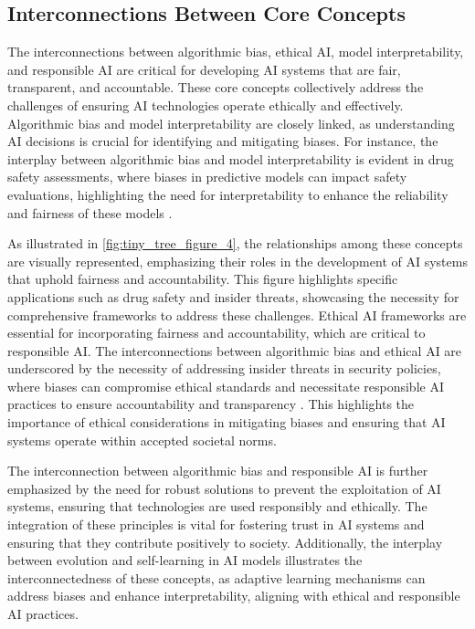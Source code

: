 \subsection{Interconnections Between Core Concepts} \label{subsec:Interconnections Between Core Concepts}

The interconnections between algorithmic bias, ethical AI, model interpretability, and responsible AI are critical for developing AI systems that are fair, transparent, and accountable. These core concepts collectively address the challenges of ensuring AI technologies operate ethically and effectively. Algorithmic bias and model interpretability are closely linked, as understanding AI decisions is crucial for identifying and mitigating biases. For instance, the interplay between algorithmic bias and model interpretability is evident in drug safety assessments, where biases in predictive models can impact safety evaluations, highlighting the need for interpretability to enhance the reliability and fairness of these models \cite{xi2022statisticallearningpreclinicaldrug}.

As illustrated in \autoref{fig:tiny_tree_figure_4}, the relationships among these concepts are visually represented, emphasizing their roles in the development of AI systems that uphold fairness and accountability. This figure highlights specific applications such as drug safety and insider threats, showcasing the necessity for comprehensive frameworks to address these challenges. Ethical AI frameworks are essential for incorporating fairness and accountability, which are critical to responsible AI. The interconnections between algorithmic bias and ethical AI are underscored by the necessity of addressing insider threats in security policies, where biases can compromise ethical standards and necessitate responsible AI practices to ensure accountability and transparency \cite{kammller2020applyingisabelleinsiderframework}. This highlights the importance of ethical considerations in mitigating biases and ensuring that AI systems operate within accepted societal norms.

The interconnection between algorithmic bias and responsible AI is further emphasized by the need for robust solutions to prevent the exploitation of AI systems, ensuring that technologies are used responsibly and ethically. The integration of these principles is vital for fostering trust in AI systems and ensuring that they contribute positively to society. Additionally, the interplay between evolution and self-learning in AI models illustrates the interconnectedness of these concepts, as adaptive learning mechanisms can address biases and enhance interpretability, aligning with ethical and responsible AI practices.

